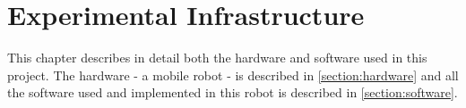 \chapter{Experimental Infrastructure}

This chapter describes in detail both the hardware and software used in this project. The hardware - a mobile robot - is described in \cref{section:hardware} and all the software used and implemented in this robot is described in \cref{section:software}.


\FloatBarrier


